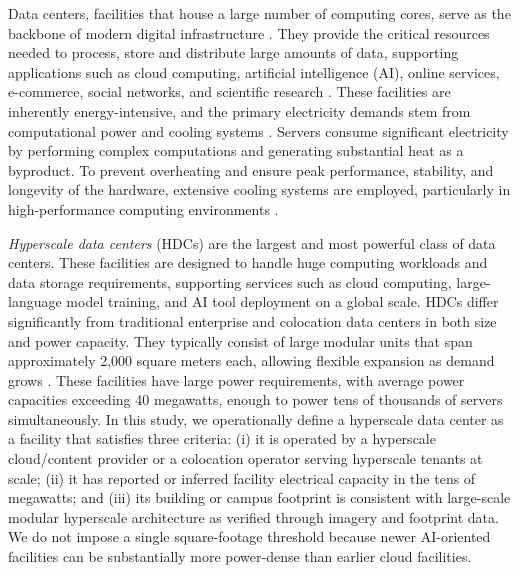 \documentclass[12pt]{article}
\begin{document}
\doublespacing

Data centers, facilities that house a large number of computing cores, serve as the backbone of modern digital infrastructure \cite {crawford2024generative,erdenesanaa2023ai,patterson2021carbon,mytton2022estimates,Shehabi2024DataCenter,Han2025}. They provide the critical resources needed to process, store and distribute large amounts of data, supporting applications such as cloud computing, artificial intelligence (AI), online services, e-commerce, social networks, and scientific research \cite{kamiya2024energy}. These facilities are inherently energy-intensive, and the primary electricity demands stem from computational power and cooling systems \cite{sun2021prototype}. Servers consume significant electricity by performing complex computations and generating substantial heat as a byproduct. To prevent overheating and ensure peak performance, stability, and longevity of the hardware, extensive cooling systems are employed, particularly in high-performance computing environments \cite{dayarathna2015data}.

\textit{Hyperscale data centers} (HDCs) are the largest and most powerful class of data centers. These facilities are designed to handle huge computing workloads and data storage requirements, supporting services such as cloud computing, large-language model training, and AI tool deployment on a global scale. HDCs differ significantly from traditional enterprise and colocation data centers in both size and power capacity. They typically consist of large modular units that span approximately 2,000 square meters each, allowing flexible expansion as demand grows \cite{Shehabi2024DataCenter}. These facilities have large power requirements, with average power capacities exceeding 40 megawatts, enough to power tens of thousands of servers simultaneously. In this study, we operationally define a hyperscale data center as a facility that satisfies three criteria: (i) it is operated by a hyperscale cloud/content provider or a colocation operator serving hyperscale tenants at scale; (ii) it has reported or inferred facility electrical capacity in the tens of megawatts; and (iii) its building or campus footprint is consistent with large-scale modular hyperscale architecture as verified through imagery and footprint data. We do not impose a single square-footage threshold because newer AI-oriented facilities can be substantially more power-dense than earlier cloud facilities.
\end{document}
